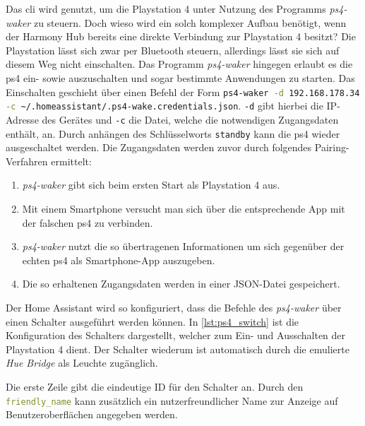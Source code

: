 Das \ac{cli} wird genutzt, um die Playstation 4 unter Nutzung des Programms \textit{ps4-waker}\cite{dhleongp12:online} zu steuern.
Doch wieso wird ein solch komplexer Aufbau benötigt, wenn der Harmony Hub bereits eine direkte Verbindung zur Playstation 4 besitzt?
Die Playstation lässt sich zwar per Bluetooth steuern, allerdings lässt sie sich auf diesem Weg nicht einschalten.
Das Programm \textit{ps4-waker} hingegen erlaubt es die \ac{ps4} ein- sowie auszuschalten und sogar bestimmte Anwendungen zu starten.
Das Einschalten geschieht über einen Befehl der Form \lstinline[language=bash]{ps4-waker -d 192.168.178.34  -c ~/.homeassistant/.ps4-wake.credentials.json}.
\lstinline[language=bash]{-d} gibt hierbei die IP-Adresse des Gerätes und
\lstinline[language=bash]{-c} die Datei,
welche die notwendigen Zugangsdaten enthält, an.
Durch anhängen des Schlüsselworts \lstinline[language=bash]{standby} kann die
\ac{ps4} wieder ausgeschaltet werden.
Die Zugangsdaten werden zuvor durch folgendes Pairing-Verfahren ermittelt:
\begin{enumerate}
    \setlength\itemsep{-0.5em}
    \item \textit{ps4-waker} gibt sich beim ersten Start als Playstation 4 aus.
    \item Mit einem Smartphone versucht man sich über die entsprechende App mit der falschen \ac{ps4} zu verbinden.
    \item \textit{ps4-waker} nutzt die so übertragenen Informationen um sich gegenüber der echten \ac{ps4} als Smartphone-App auszugeben.
    \item Die so erhaltenen Zugangsdaten werden in einer JSON-Datei gespeichert.
\end{enumerate}

Der Home Assistant wird so konfiguriert,
dass die Befehle des \textit{ps4-waker} über einen Schalter ausgeführt werden können.
In \autoref{lst:ps4_switch} ist die Konfiguration des Schalters dargestellt,
welcher zum Ein- und Ausschalten der Playstation 4 dient.
Der Schalter wiederum ist automatisch durch die emulierte \textit{Hue Bridge} als Leuchte zugänglich.



Die erste Zeile gibt die eindeutige ID für den Schalter an.
Durch den \lstinline[language=yaml]{friendly_name} kann zusätzlich ein nutzerfreundlicher Name zur Anzeige auf Benutzeroberflächen angegeben werden.

